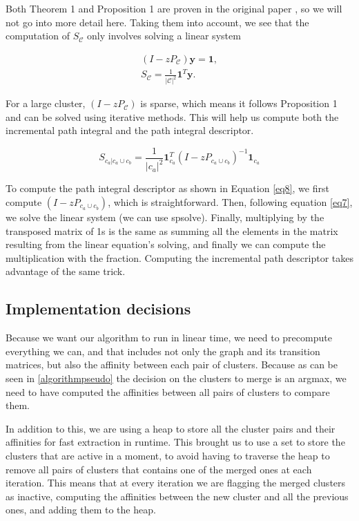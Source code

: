 \documentclass[
	10pt,
	parskip=half-,	
	paper=a4,
	english
	]{scrartcl}
\begin{document}
Both Theorem 1 and Proposition 1 are proven in the original paper \cite{citation1}, so we will not go into more detail here. Taking them into account, we see that the computation of $S_{\mathcal{C}}$ only involves solving a linear system

\begin{equation}
    \begin{split}
    (I - zP_{\mathcal{C}}) \mathbf{y} = \mathbf{1},
    \label{eq7}
    \\
    S_{\mathcal{C}} = \frac{1}{|\mathcal{C}|^2} \mathbf{1}^{T} \mathbf{y}.
    \end{split}
\end{equation}

For a large cluster, $(I - zP_{\mathcal{C}})$ is sparse, which means it follows Proposition 1 and can be solved using iterative methods. This will help us compute both the incremental path integral and the path integral descriptor.

\begin{equation}
    S_{c_a|c_a \cup c_b} = \frac{1}{|c_a|^2} \mathbf{1}_{c_a}^{T} (I - zP_{c_a \cup c_b})^{-1} \mathbf{1}_{c_a}
\end{equation}

To compute the path integral descriptor as shown in Equation \ref{eq8}, we first compute \((I - zP_{c_a \cup c_b})\), which is straightforward. Then, following equation \ref{eq7}, we solve the linear system (we can use spsolve). Finally, multiplying by the transposed matrix of 1s is the same as summing all the elements in the matrix resulting from the linear equation's solving, and finally we can compute the multiplication with the fraction. Computing the incremental path descriptor takes advantage of the same trick. 

\subsection{Implementation decisions}

Because we want our algorithm to run in linear time, we need to precompute everything we can, and that includes not only the graph and its transition matrices, but also the affinity between each pair of clusters. Because as can be seen in \ref{algorithmpseudo} the decision on the clusters to merge is an argmax, we need to have computed the affinities between all pairs of clusters to compare them.

In addition to this, we are using a heap to store all the cluster pairs and their affinities for fast extraction in runtime. This brought us to use a set to store the clusters that are active in a moment, to avoid having to traverse the heap to remove all pairs of clusters that contains one of the merged ones at each iteration. This means that at every iteration we are flagging the merged clusters as inactive, computing the affinities between the new cluster and all the previous ones, and adding them to the heap.
\end{document}
